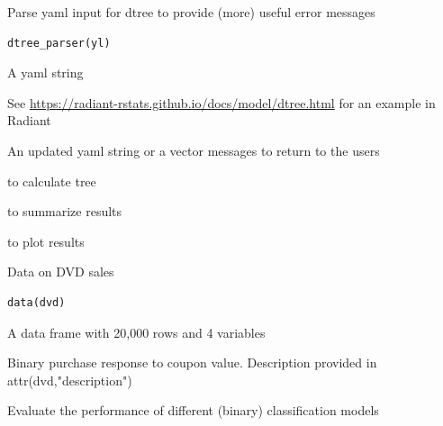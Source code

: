 \documentclass[a4paper]{book}
\begin{document}
%
\begin{Description}
Parse yaml input for dtree to provide (more) useful error messages
\end{Description}
%
\begin{Usage}
\begin{verbatim}
dtree_parser(yl)
\end{verbatim}
\end{Usage}
%
\begin{Arguments}
\begin{ldescription}
\item[\code{yl}] A yaml string
\end{ldescription}
\end{Arguments}
%
\begin{Details}
See \url{https://radiant-rstats.github.io/docs/model/dtree.html} for an example in Radiant
\end{Details}
%
\begin{Value}
An updated yaml string or a vector messages to return to the users
\end{Value}
%
\begin{SeeAlso}
 to calculate tree

 to summarize results

 to plot results
\end{SeeAlso}
%
\begin{Description}
Data on DVD sales
\end{Description}
%
\begin{Usage}
\begin{verbatim}
data(dvd)
\end{verbatim}
\end{Usage}
%
\begin{Format}
A data frame with 20,000 rows and 4 variables
\end{Format}
%
\begin{Details}
Binary purchase response to coupon value. Description provided in attr(dvd,"description")
\end{Details}
%
\begin{Description}
Evaluate the performance of different (binary) classification models
\end{Description}
\end{document}
